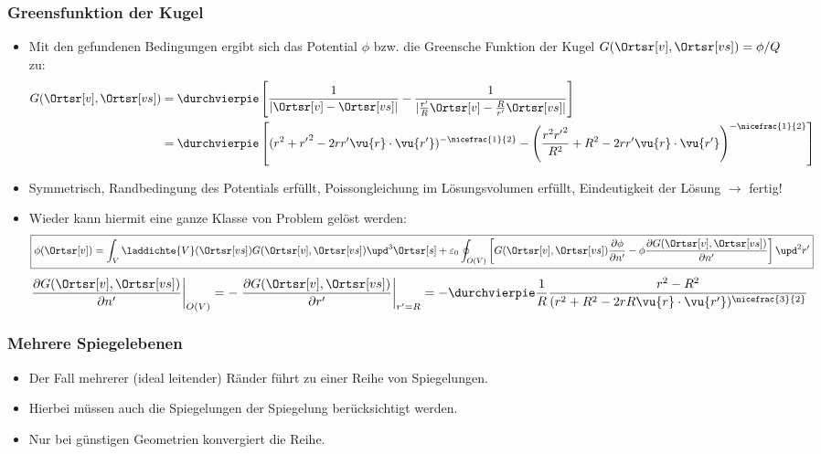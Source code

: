   \begin{frame}
    \frametitle{Greensfunktion der Kugel}
    \begin{itemize}[<+->]
    \item Mit den gefundenen Bedingungen ergibt sich das Potential $\phi$ bzw. die \alert{Greensche Funktion der Kugel} $G(\Ortsr[v],\Ortsr[vs]) = \phi/Q$ zu:
      \begin{align*}
        G(\Ortsr[v],\Ortsr[vs]) & = \durchvierpie \left[ \frac{1}{|\Ortsr[v] - \Ortsr[vs]|}  -  \frac{1}{|\frac{r'}{R}\Ortsr[v] - \frac{R}{r'}\Ortsr[vs]|} \right] \\
        & = \durchvierpie \left[  ( r^2+{r'}^2-2rr'\vu{r}\cdot \vu{r'})^{-\nicefrac{1}{2}}   - \left( \frac{r^2{r'}^2}{R^2}+R^2-2rr'\vu{r}\cdot \vu{r'}  \right)^{-\nicefrac{1}{2}} \right]
      \end{align*}
    \item Symmetrisch, Randbedingung des Potentials erfüllt, Poissongleichung im Lösungsvolumen erfüllt, Eindeutigkeit der Lösung $\to$ fertig!
      \item Wieder kann hiermit eine ganze Klasse von Problem gelöst werden:
                     $$
\boxed{      \phi(\Ortsr[v]) = \int_V
  \laddichte{V}(\Ortsr[vs]) G(\Ortsr[v],\Ortsr[vs]) \upd^3\Ortsr[s] + \varepsilon_0 \oint_{O(V)} \left[ G(\Ortsr[v],\Ortsr[vs]) \frac{\partial\phi}{\partial n'} - \phi \frac{\partial G(\Ortsr[v],\Ortsr[vs])}{\partial n'}\right] \upd^2r'}
 $$
 $$
 \left. \frac{ \partial G(\Ortsr[v],\Ortsr[vs]) }{ \partial n' } \right|_{O(V)} =  - \left. \frac{ \partial G(\Ortsr[v],\Ortsr[vs]) }{ \partial r' }\right|_{r'=R}  = - \durchvierpie \frac{1}{R} \frac{ r^2-R^2 }{ (r^2+R^2-2rR \vu{r}\cdot \vu{r'})^{\nicefrac{3}{2}} }
 $$
      \end{itemize}
  \end{frame}

\begin{frame}
  \frametitle{Mehrere Spiegelebenen}

\begin{itemize}[<+->]
\item Der Fall mehrerer (ideal leitender) Ränder führt zu einer Reihe von Spiegelungen.
\item Hierbei müssen auch die \alert{Spiegelungen der Spiegelung} berücksichtigt werden.
\item Nur bei günstigen Geometrien konvergiert die Reihe.
\end{itemize}
\vspace{1em}

\resizebox{\linewidth}{!}{}

\end{frame}
  

   
